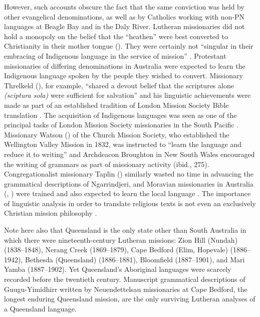 However, such accounts obscure the fact that the same conviction was held by other evangelical denominations, as well as by Catholics working with non-PN languages at Beagle Bay and in the Daly River. Lutheran missionaries did not hold a monopoly on the belief that the “heathen” were best converted to Christianity in their mother tongue (\citealt[21--26]{Stockigt_2020}). They were certainly not “singular in their embracing of Indigenous language in the service of mission” \citep[362]{kneebone_language_2005}. Protestant missionaries of differing denominations in Australia were expected to learn the Indigenous language spoken by the people they wished to convert. Missionary Threlkeld (), for example, “shared a devout belief that the scriptures alone \textit{(sciptura sola)} were sufficient for salvation” \citep[116]{wafer_waiting_2011} and his linguistic achievements were made as part of an established tradition of London Mission Society Bible translation \citep[107]{roberts_language_2008}. The acquisition of Indigenous languages was seen as one of the principal tasks of London Mission Society missionaries in the South Pacific \citep[xxiii]{hughes_introduction_1998}. Missionary Watson () of the Church Mission Society, who established the Wellington Valley Mission in 1832, was instructed to “learn the language and reduce it to writing” \citep[297]{bridges_church_1978} and Archdeacon Broughton in New South Wales encouraged the writing of grammars as part of missionary activity (ibid., 275). Congregationalist missionary Taplin () similarly wasted no time in advancing the grammatical descriptions of Ngarrindjeri, and Moravian missionaries in Australia (, ) were trained and also expected to learn the local language \citep[319]{edwards_moravian_2007}. The importance of linguistic analysis in order to translate religious texts is not even an exclusively Christian mission philosophy \citep[33]{ostler_social_2004}.

Note here also that Queensland is the only state other than South Australia in which there were nineteenth-century Lutheran missions: Zion Hill (Nundah) (1838–1848), Nerang Creek (1869--1879), Cape Bedford (Elim, Hopevale) (1886--1942), Bethesda (Queensland) (1886--1881), Bloomfield (1887--1901), and Mari Yam\-ba (1887--1902). Yet Queensland’s Aboriginal languages were scarcely recorded before the twentieth century. Manuscript grammatical descriptions of Guugu{\hyp}Yi\-mi\-dhirr written by Neuendettelsau missionaries \citet{schwarz_koko_1900} at Cape Bedford, the longest enduring Queensland mission, are the only surviving Lutheran analyses of a Queensland language.

